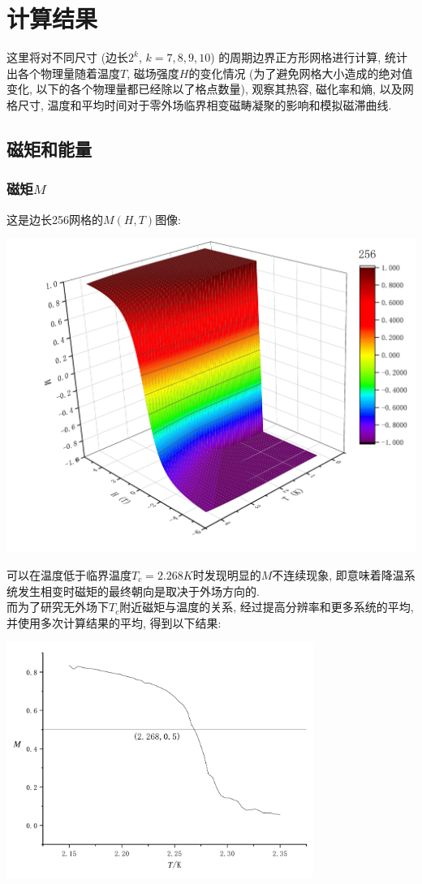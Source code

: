 \documentclass[UTF8]{ctexart}
\begin{document}
    \section{计算结果}
        \indent 这里将对不同尺寸 (边长$2^k$, $k=7,8,9,10$) 的周期边界正方形网格进行计算, 统计出各个物理量随着温度$T$, 磁场强度$H$的变化情况 (为了避免网格大小造成的绝对值变化,
        以下的各个物理量都已经除以了格点数量), 观察其热容, 磁化率和熵, 以及网格尺寸, 温度和平均时间对于零外场临界相变磁畴凝聚的影响和模拟磁滞曲线.
        \subsection{磁矩和能量}
            \subsubsection{磁矩$M$}
                \indent 这是边长256网格的$M(H,T)$图像:
                \begin{center}
                    \includegraphics[width=17cm]{M-HT256.pdf}
                \end{center}
                可以在温度低于临界温度$T_c=2.268K$时发现明显的$M$不连续现象, 即意味着降温系统发生相变时磁矩的最终朝向是取决于外场方向的.\\
                \indent 而为了研究无外场下$T_c$附近磁矩与温度的关系, 经过提高分辨率和更多系统的平均, 并使用多次计算结果的平均, 得到以下结果:
                \begin{center}
                    \includegraphics[width=10cm]{PhaseTransition.pdf}
                \end{center}
                \newpage
\end{document}
